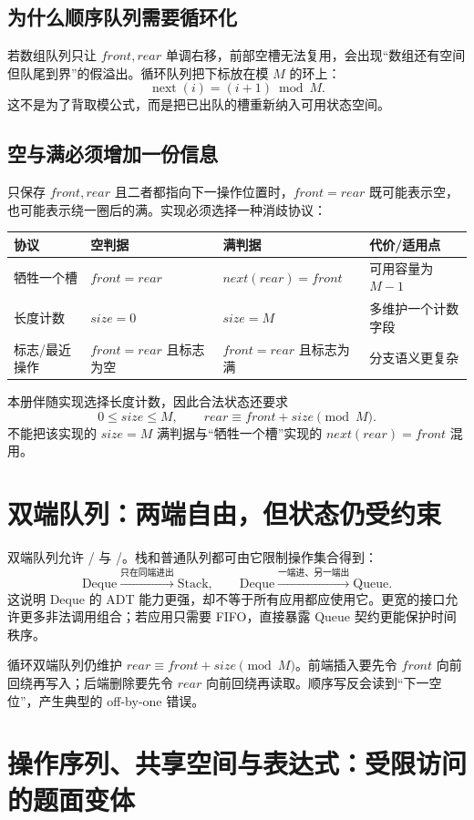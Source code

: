 \documentclass[UTF8,fontset=none,11pt,a4paper]{ctexart}
\begin{document}
\subsection{为什么顺序队列需要循环化}
若数组队列只让 $front,rear$ 单调右移，前部空槽无法复用，会出现“数组还有空间但队尾到界”的假溢出。循环队列把下标放在模 $M$ 的环上：
\[
\operatorname{next}(i)=(i+1)\bmod M.
\]
这不是为了背取模公式，而是把已出队的槽重新纳入可用状态空间。

\subsection{空与满必须增加一份信息}
只保存 $front,rear$ 且二者都指向下一操作位置时，$front=rear$ 既可能表示空，也可能表示绕一圈后的满。实现必须选择一种消歧协议：
\begin{center}\small
\begin{tabularx}{\linewidth}{L{2.4cm}YYY}
\toprule
协议 & 空判据 & 满判据 & 代价/适用点\\
\midrule
牺牲一个槽 & $front=rear$ & $next(rear)=front$ & 可用容量为 $M-1$\\
长度计数 & $size=0$ & $size=M$ & 多维护一个计数字段\\
标志/最近操作 & $front=rear$ 且标志为空 & $front=rear$ 且标志为满 & 分支语义更复杂\\
\bottomrule
\end{tabularx}
\end{center}
本册伴随实现选择长度计数，因此合法状态还要求
\[
0\le size\le M,\qquad rear\equiv front+size\pmod M.
\]
不能把该实现的 $size=M$ 满判据与“牺牲一个槽”实现的 $next(rear)=front$ 混用。

\section{双端队列：两端自由，但状态仍受约束}
双端队列允许 / 与 /。栈和普通队列都可由它限制操作集合得到：
\[
\text{Deque}\xrightarrow{\text{只在同端进出}}\text{Stack},\qquad
\text{Deque}\xrightarrow{\text{一端进、另一端出}}\text{Queue}.
\]
这说明 Deque 的 ADT 能力更强，却不等于所有应用都应使用它。更宽的接口允许更多非法调用组合；若应用只需要 FIFO，直接暴露 Queue 契约更能保护时间秩序。

循环双端队列仍维护 $rear\equiv front+size\pmod M$。前端插入要先令 $front$ 向前回绕再写入；后端删除要先令 $rear$ 向前回绕再读取。顺序写反会读到“下一空位”，产生典型的 off-by-one 错误。

\section{操作序列、共享空间与表达式：受限访问的题面变体}
\end{document}
